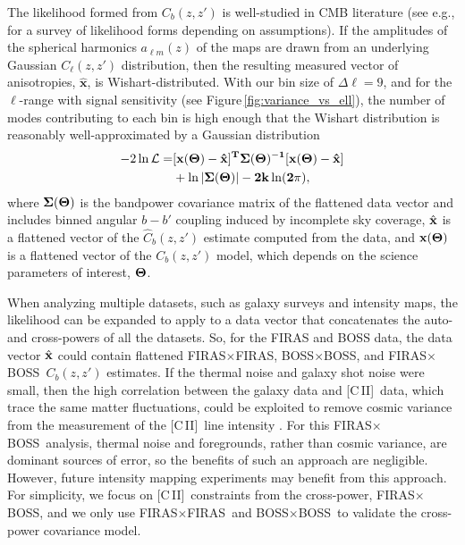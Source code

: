 \documentclass[fleqn,usenatbib]{mnras}
\newcommand{\cii}{[C{\sc\,II}]}
\newcommand{\FF}{FIRAS${\times}$FIRAS}
\newcommand{\BB}{BOSS${\times}$BOSS}
\newcommand{\FB}{FIRAS${\times}$BOSS}
\begin{document}
The likelihood formed from $C_{b}(z,z')$ is well-studied in CMB literature (see e.g., \cite{Hamimeche:2008ai} for a survey of likelihood forms depending on assumptions). If the amplitudes of the spherical harmonics $a_{\ell m}(z)$ of the maps are drawn from an underlying Gaussian $C_{\ell}(z,z')$ distribution, then the resulting measured vector of anisotropies, $\mathbf{\hat{x}}$, is Wishart-distributed. With our bin size of $\Delta \ell =9$, and for the $\ell$-range with signal sensitivity (see Figure\,\ref{fig:variance_vs_ell}), the number of modes contributing to each bin is high enough that the Wishart distribution is reasonably well-approximated by a Gaussian distribution
\begin{equation}
\begin{split}\label{eq:gaussian_dist}
-2\ln\mathcal{L} = &[ \bf{x}(\Theta) - \hat{\bf{x}} ]^T \bf{\Sigma}(\Theta)^{-1} [\bf{x}(\Theta) - \hat{\bf{x}} ]\\
&+ \ln |\bf{\Sigma}(\Theta)| - 2k\ln(2\pi),
\end{split}
\end{equation}
where $\bf{\Sigma}(\Theta)$ is the bandpower covariance matrix of the flattened data vector and includes binned angular $b{-}b'$ coupling induced by incomplete sky coverage, $\hat{\bf{x}}$ is a flattened vector of the $\hat{C}_{b}(z,z')$ estimate computed from the data, and $\bf{x}(\Theta)$ is a flattened vector of the $C_{b}(z,z')$ model, which depends on the science parameters of interest, $\bf{\Theta}$. 

When analyzing multiple datasets, such as galaxy surveys and intensity maps, the likelihood can be expanded to apply to a data vector that concatenates the auto- and cross-powers of all the datasets. So, for the FIRAS and BOSS data, the data vector $\hat{\bf{x}}$ could contain flattened \FF, \BB, and \FB\ $C_{b}(z,z')$ estimates. If the thermal noise and galaxy shot noise were small, then the high correlation between the galaxy data and \cii\ data, which trace the same matter fluctuations, could be exploited to remove cosmic variance from the measurement of the \cii\ line intensity \citep{McDonald:2008sh, Bull:2014rha, 2016MNRAS.455.3871A, switzer2017tracing, Switzer:2018tel, 2021PhRvD.104h3501O}. For this \FB\ analysis, thermal noise and foregrounds, rather than cosmic variance, are dominant sources of error, so the benefits of such an approach are negligible. However, future intensity mapping experiments may benefit from this approach. For simplicity, we focus on \cii\ constraints from the cross-power, \FB, and we only use \FF\ and \BB\ to validate the cross-power covariance model.
\end{document}
